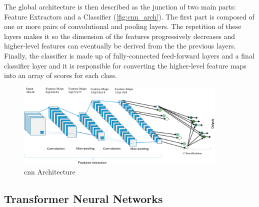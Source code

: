 The global architecture is then described as the junction of two main parts: Feature Extractors and a Classifier (\autoref{fig:cnn_arch}). The first part is composed of one or more pairs of convolutional and pooling layers. The repetition of these layers makes it so the dimension of the features progressively decreases and higher-level features can eventually be derived from the the previous layers. Finally, the classifier is made up of fully-connected feed-forward layers and a final classifier layer and it is responsible for converting the higher-level feature maps into an array of scores for each class.

\begin{figure}[ht]
    \centering
    \includegraphics[width=0.9\textwidth]{figs/cnn_arch.pdf}
    \caption[\acs{cnn} Architecture]{\acs{cnn} Architecture \cite{Alom2019}}
    \label{fig:cnn_arch}
\end{figure}

\subsection{Transformer Neural Networks}
\label{subsection:transformer_neural_networks}

